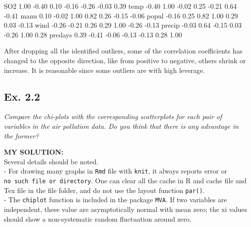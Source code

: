 \documentclass[
]{article}
\newenvironment{Shaded}{\begin{snugshade}}{\end{snugshade}}
\newcommand{\FloatTok}[1]{\textcolor[rgb]{0.00,0.00,0.81}{#1}}
\newcommand{\NormalTok}[1]{#1}
\newcommand{\SpecialCharTok}[1]{\textcolor[rgb]{0.00,0.00,0.00}{#1}}
\begin{document}
\begin{Shaded}
\begin{Highlighting}[]
\NormalTok{SO2      }\FloatTok{1.00} \SpecialCharTok{{-}}\FloatTok{0.40}  \FloatTok{0.10} \SpecialCharTok{{-}}\FloatTok{0.16} \SpecialCharTok{{-}}\FloatTok{0.26}  \SpecialCharTok{{-}}\FloatTok{0.03}    \FloatTok{0.39}
\NormalTok{temp    }\SpecialCharTok{{-}}\FloatTok{0.40}  \FloatTok{1.00} \SpecialCharTok{{-}}\FloatTok{0.02}  \FloatTok{0.25} \SpecialCharTok{{-}}\FloatTok{0.21}   \FloatTok{0.64}   \SpecialCharTok{{-}}\FloatTok{0.41}
\NormalTok{manu     }\FloatTok{0.10} \SpecialCharTok{{-}}\FloatTok{0.02}  \FloatTok{1.00}  \FloatTok{0.82}  \FloatTok{0.26}  \SpecialCharTok{{-}}\FloatTok{0.15}   \SpecialCharTok{{-}}\FloatTok{0.06}
\NormalTok{popul   }\SpecialCharTok{{-}}\FloatTok{0.16}  \FloatTok{0.25}  \FloatTok{0.82}  \FloatTok{1.00}  \FloatTok{0.29}   \FloatTok{0.03}   \SpecialCharTok{{-}}\FloatTok{0.13}
\NormalTok{wind    }\SpecialCharTok{{-}}\FloatTok{0.26} \SpecialCharTok{{-}}\FloatTok{0.21}  \FloatTok{0.26}  \FloatTok{0.29}  \FloatTok{1.00}  \SpecialCharTok{{-}}\FloatTok{0.26}   \SpecialCharTok{{-}}\FloatTok{0.13}
\NormalTok{precip  }\SpecialCharTok{{-}}\FloatTok{0.03}  \FloatTok{0.64} \SpecialCharTok{{-}}\FloatTok{0.15}  \FloatTok{0.03} \SpecialCharTok{{-}}\FloatTok{0.26}   \FloatTok{1.00}    \FloatTok{0.28}
\NormalTok{predays  }\FloatTok{0.39} \SpecialCharTok{{-}}\FloatTok{0.41} \SpecialCharTok{{-}}\FloatTok{0.06} \SpecialCharTok{{-}}\FloatTok{0.13} \SpecialCharTok{{-}}\FloatTok{0.13}   \FloatTok{0.28}    \FloatTok{1.00}
\end{Highlighting}
\end{Shaded}

After dropping all the identified outliers, some of the correlation
coefficients has changed to the opposite direction, like from positive
to negative, others shrink or increase. It is reasonable since some
outliers are with high leverage.

\hypertarget{ex.-2.2}{%
\subsection{Ex. 2.2}\label{ex.-2.2}}

\emph{Compare the chi-plots with the corresponding scatterplots for each
pair of variables in the air pollution data. Do you think that there is
any advantage in the former?}

\textbf{MY SOLUTION:}\\
Several details should be noted.\\
- For drawing many graphs in \texttt{Rmd} file with \texttt{knit}, it
always reports error or \texttt{no\ such\ file\ or\ directory}. One can
clear all the cache in R and cache file and Tex file in the file folder,
and do not use the layout function \texttt{par()}.\\
- The \texttt{chiplot} function is included in the package \texttt{MVA}.
If two variables are independent, these value are asymptotically normal
with mean zero; the xi values should show a non-systematic random
fluctuation around zero.
\end{document}
